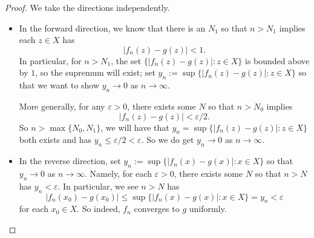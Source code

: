 \begin{proof}
	We take the directions independently.
	\begin{itemize}
		\item In the forward direction, we know that there is an $N_1$ so that $n>N_1$ implies each $z\in X$ has
		\[|f_n(z)-g(z)|<1.\]
		In particular, for $n>N_1$, the set $\{|f_n(z)-g(z)|:z\in X\}$ is bounded above by $1$, so the supremum will exist; set $y_n:=\sup\{|f_n(z)-g(z)|:z\in X\}$ so that we want to show $y_n\to0$ as $n\to\infty$.
	
		More generally, for any $\varepsilon>0$, there exists some $N$ so that $n>N_0$ implies
		\[|f_n(z)-g(z)|<\varepsilon/2.\]
		So $n>\max\{N_0,N_1\}$, we will have that $y_n=\sup\{|f_n(z)-g(z)|:z\in X\}$ both exists and has $y_n\le\varepsilon/2<\varepsilon$. So we do get $y_n\to0$ as $n\to\infty$.

		\item In the reverse direction, set $y_n:=\sup\{|f_n(x)-g(x)|:x\in X\}$ so that $y_n\to0$ as $n\to\infty$. Namely, for each $\varepsilon>0$, there exists some $N$ so that $n>N$ has $y_n<\varepsilon$. In particular, we see $n>N$ has
		\[|f_n(x_0)-g(x_0)|\le\sup\{|f_n(x)-g(x)|:x\in X\}=y_n<\varepsilon\]
		for each $x_0\in X$. So indeed, $f_n$ converges to $g$ uniformly.
		\qedhere
	\end{itemize}
\end{proof}

